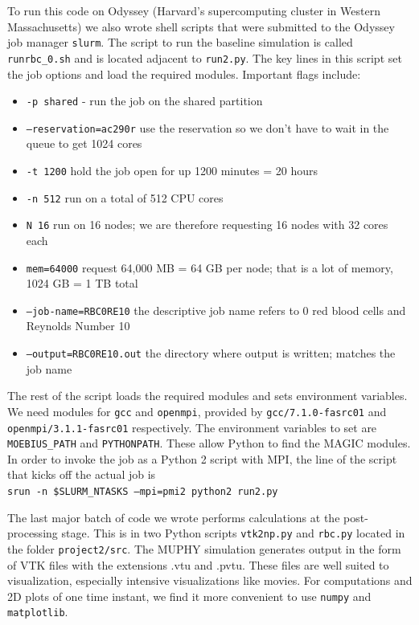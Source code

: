 \documentclass[11pt]{article} %
\newcommand{\tty}[1]{\texttt{#1}}
\begin{document}
To run this code on Odyssey (Harvard's supercomputing cluster in Western Massachusetts)
we also wrote shell scripts that were submitted to the Odyssey job manager \tty{slurm}.
The script to run the baseline simulation is called \tty{runrbc\_0.sh} and is located adjacent to \tty{run2.py}.  
The key lines in this script set the job options and load the required modules.  
Important flags include:
\begin{itemize}
\item \tty{-p shared} - run the job on the shared partition
\item \tty{--reservation=ac290r} use the reservation so we don't have to wait in the queue to get 1024 cores 
\item \tty{-t 1200} hold the job open for up 1200 minutes = 20 hours
\item \tty{-n 512} run on a total of 512 CPU cores
\item \tty{N 16} run on 16 nodes; we are therefore requesting 16 nodes with 32 cores each
\item \tty{mem=64000} request 64,000 MB = 64 GB per node; that is a lot of memory, 1024 GB = 1 TB total
\item \tty{--job-name=RBC0RE10} the descriptive job name refers to 0 red blood cells and Reynolds Number 10
\item \tty{--output=RBC0RE10.out} the directory where output is written; matches the job name
\end{itemize}

The rest of the script loads the required modules and sets environment variables.
We need modules for \tty{gcc} and \tty{openmpi}, provided by 
\tty{gcc/7.1.0-fasrc01} and \tty{openmpi/3.1.1-fasrc01} respectively.
The environment variables to set are \tty{MOEBIUS\_PATH} and \tty{PYTHONPATH}.
These allow Python to find the MAGIC modules.
In order to invoke the job as a Python 2 script with MPI, the 
line of the script that kicks off the actual job is\\
\tty{srun -n \$SLURM\_NTASKS --mpi=pmi2 python2 run2.py}

The last major batch of code we wrote performs calculations at the post-processing stage.
This is in two Python scripts \tty{vtk2np.py} and \tty{rbc.py} located in the folder \tty{project2/src}.
The MUPHY simulation generates output in the form of VTK files with the extensions .vtu and .pvtu.
These files are well suited to visualization, especially intensive visualizations like movies.
For computations and 2D plots of one time instant, we find it more convenient to use 
\tty{numpy} and \tty{matplotlib}.
\end{document}
